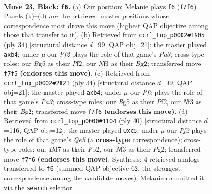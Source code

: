 \documentclass[11pt]{article}
\begin{document}
\clearpage

\begin{figure}[p]\centering
\begin{subfigure}{0.46\textwidth}\centering
\resizebox{\linewidth}{!}{%
\newchessgame
\chessboard[
  setfen={r3r3/1ppb1pkp/8/p2p2b1/6P1/NPB1Pn2/P4P1q/RN2RK2 b - - 1 23},
  showmover=false,
  pgfstyle=straightmove, color=movearrow, markmove={f7-f6}
]}
\caption{}
\end{subfigure}\hfill
\begin{subfigure}{0.46\textwidth}\centering
\resizebox{\linewidth}{!}{%
\newchessgame
\chessboard[
  setfen={2rr4/p3kppp/b4n2/2p3N1/1n1p4/PPN3P1/1K2PPBP/3R3R w - - 0 18},
  showmover=false,
  pgfstyle=straightmove, color=movearrow, markmove={a3-b4}
]}
\caption{}
\end{subfigure}
\\[4pt]
\begin{subfigure}{0.46\textwidth}\centering
\resizebox{\linewidth}{!}{%
\newchessgame
\chessboard[
  setfen={2rr4/p3kppp/b4n2/2p3N1/1n1p4/PPN3P1/1K2PPBP/3R3R w - - 0 18},
  showmover=false,
  pgfstyle=straightmove, color=movearrow, markmove={a3-b4}
]}
\caption{}
\end{subfigure}\hfill
\begin{subfigure}{0.46\textwidth}\centering
\resizebox{\linewidth}{!}{%
\newchessgame
\chessboard[
  setfen={r2qnrk1/pp3p1p/2bP2p1/2p1Q3/2P5/2NB3P/PP4P1/R4RK1 w - - 3 21},
  showmover=false,
  pgfstyle=straightmove, color=movearrow, markmove={e5-c5}
]}
\caption{}
\end{subfigure}
\caption{\textbf{Move 23, Black: \texttt{f6}.} (a) Our position; Melanie plays \texttt{f6} (\texttt{f7f6}). Panels (b)--(d) are the retrieved master positions whose correspondence most drove this move (highest QAP objective among those that transfer to it). (b) Retrieved from \texttt{ccrl\_top\_p0002\#1905} (ply 34) [structural distance $d$=99, QAP obj=21]: the master played \texttt{axb4}; under $\mu$ our \emph{Pf2} plays the role of that game's \emph{Pa3}; cross-type roles: our \emph{B}g5 as their \emph{P}f2, our \emph{N}f3 as their \emph{B}g2; transferred move \texttt{f7f6} \textbf{(endorses this move)}. (c) Retrieved from \texttt{ccrl\_top\_p0002\#2821} (ply 34) [structural distance $d$=99, QAP obj=21]: the master played \texttt{axb4}; under $\mu$ our \emph{Pf2} plays the role of that game's \emph{Pa3}; cross-type roles: our \emph{B}g5 as their \emph{P}f2, our \emph{N}f3 as their \emph{B}g2; transferred move \texttt{f7f6} \textbf{(endorses this move)}. (d) Retrieved from \texttt{ccrl\_top\_p0000\#1104} (ply 40) [structural distance $d$=116, QAP obj=12]: the master played \texttt{Qxc5}; under $\mu$ our \emph{Pf2} plays the role of that game's \emph{Qe5} (a \textbf{cross-type} correspondence); cross-type roles: our \emph{B}d7 as their \emph{P}b2, our \emph{N}f3 as their \emph{P}g2; transferred move \texttt{f7f6} \textbf{(endorses this move)}. Synthesis: 4 retrieved analogs transferred to \texttt{f6} (summed QAP objective 62, the strongest correspondence among the candidate moves); Melanie committed it via the \texttt{search} selector.}
\label{fig:thought-m45}
\end{figure}
\end{document}
